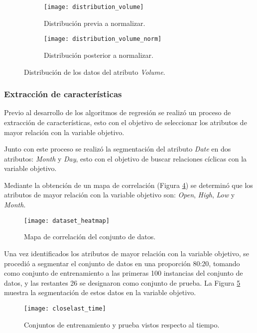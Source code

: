 \begin{figure}[t]
	\centering
	\begin{subfigure}{\textwidth}
         \centering
         \texttt{[image: distribution\_volume]}
         \caption{Distribución previa a normalizar.}
         \label{Fig: volume_org}
	\end{subfigure}
	\vfill
	\begin{subfigure}{\textwidth}
         \centering
         \texttt{[image: distribution\_volume\_norm]}
         \caption{Distribución posterior a normalizar.}
         \label{Fig: volume_norm}
	\end{subfigure}
	\caption{Distribución de los datos del atributo \emph{Volume}.}
	\label{Fig: volume_dist}
\end{figure}



\subsubsection{Extracción de características}
Previo al desarrollo de los algoritmos de regresión se realizó un proceso de extracción de características, esto con el objetivo de seleccionar los atributos de mayor relación con la variable objetivo.

Junto con este proceso se realizó la segmentación del atributo \emph{Date} en dos atributos: \emph{Month} y \emph{Day}, esto con el objetivo de buscar relaciones cíclicas con la variable objetivo.

Mediante la obtención de un mapa de correlación (Figura \ref{Fig: heatmap}) se determinó que los atributos de mayor relación con la variable objetivo son: \emph{Open}, \emph{High}, \emph{Low} y \emph{Month}.

\begin{figure}[ht]
	\centering
	\texttt{[image: dataset\_heatmap]}
	\caption{Mapa de correlación del conjunto de datos.}
	\label{Fig: heatmap}
\end{figure}

Una vez identificados los atributos de mayor relación con la variable objetivo, se procedió a segmentar el conjunto de datos en una proporción 80:20, tomando como conjunto de entrenamiento a las primeras 100 instancias del conjunto de datos, y las restantes 26 se designaron como conjunto de prueba. La Figura \ref{Fig: over_time} muestra la segmentación de estos datos en la variable objetivo.

\begin{figure}[hb]
	\centering
	\texttt{[image: closelast\_time]}
	\caption{Conjuntos de entrenamiento y prueba vistos respecto al tiempo.}
	\label{Fig: over_time}
\end{figure}


